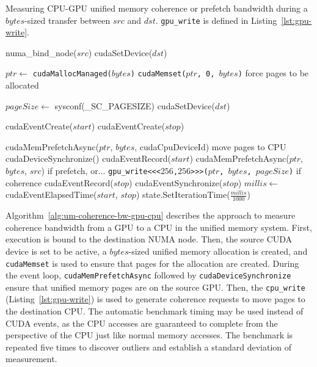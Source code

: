 \begin{algorithm}[H]
	\caption[Measuring CPU-GPU Unified Memory Coherence or Prefetch Bandwidth.]{
		Measuring CPU-GPU unified memory coherence or prefetch bandwidth during a $bytes$-sized transfer between $src$ and $dst$.
		\texttt{gpu\_write} is defined in Listing~\ref{lst:gpu-write}.
	}
	\label{alg:um-bw-cpu-gpu}
	\begin{algorithmic}[1]
		\Statex
		
		\State numa\_bind\_node($src$)
		\State cudaSetDevice($dst$)

		\State $ptr \gets$ \texttt{cudaMallocManaged($bytes$)}
		\State \texttt{cudaMemset($ptr$, 0, $bytes$)} \Comment force pages to be allocated

		\State $pageSize \gets$ sysconf(\_SC\_PAGESIZE)
		\State cudaSetDevice($dst$)

		\State cudaEventCreate($start$)
		\State cudaEventCreate($stop$)		        
				
			\State cudaMemPrefetchAsync($ptr$, $bytes$, cudaCpuDeviceId) \Comment move pages to CPU
			\State cudaDeviceSynchronize()
			\State cudaEventRecord($start$)
			\State cudaMemPrefetchAsync($ptr$, $bytes$, $src$) \Comment if prefetch, or...
			\State \texttt{gpu\_write<<<$256$,$256$>>>($ptr$, $bytes$, $pageSize$)} \Comment if coherence
			\State cudaEventRecord($stop$)
			\State cudaEventSynchronize($stop$)
			\State $millis \gets$ cudaEventElapsedTime($start$, $stop$)
			\State state.SetIterationTime($\frac{millis}{1000}$)
		\EndFor
		\EndFunction			
	\end{algorithmic}
\end{algorithm}

Algorithm~\ref{alg:um-coherence-bw-gpu-cpu} describes the approach to measure coherence bandwidth from a GPU to a CPU in the unified memory system.
First, execution is bound to the destination NUMA node.
Then, the source CUDA device is set to be active, a $bytes$-sized unified memory allocation is created, and \texttt{cudaMemset} is used to ensure that pages for the allocation are created.
During the event loop, \texttt{cudaMemPrefetchAsync} followed by \texttt{cudaDeviceSynchronize} ensure that unified memory pages are on the source GPU.
Then, the \texttt{cpu\_write} (Listing~\ref{lst:gpu-write}) is used to generate coherence requests to move pages to the destination CPU.
The automatic benchmark timing may be used instead of CUDA events, as the CPU accesses are guaranteed to complete from the perspective of the CPU just like normal memory accesses.
The benchmark is repeated five times to discover outliers and establish a standard deviation of measurement.

